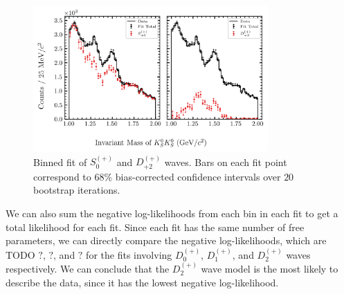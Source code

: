 \begin{figure}
  \begin{center}
    \includegraphics[width=0.8\textwidth]{figures/binned_fit_chisqdof_3.4_splot_D_1s_2b_phase_factor_waves491_uncertainty_bootstrap-CI-BC.png}
  \end{center}
  \caption{Binned fit of $S_{0}^{(+)}$ and $D_{+2}^{(+)}$ waves. Bars on each fit point correspond to $68\%$ bias-corrected confidence intervals over $20$ bootstrap iterations.}\label{fig:binned-fit-chisqdof-3.4-Sp-D2p}
\end{figure}

We can also sum the negative log-likelihoods from each bin in each fit to get a total likelihood for each fit. Since each fit has the same number of free parameters, we can directly compare the negative log-likelihoods, which are {\color{red}TODO} $?$, $?$, and $?$ for the fits involving $D_0^{(+)}$, $D_1^{(+)}$, and $D_2^{(+)}$ waves respectively. We can conclude that the $D_2^{(+)}$ wave model is the most likely to describe the data, since it has the lowest negative log-likelihood.

